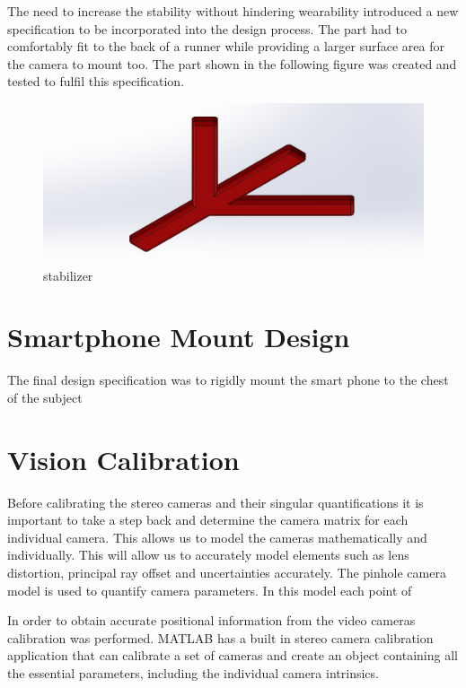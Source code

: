 The need to increase the stability without hindering wearability introduced a new specification to be incorporated into the design process. The part had to comfortably fit to the back of a runner while providing a larger surface area for the camera to mount too. The part shown in the following figure was created and tested to fulfil this specification.

\begin{figure}[!ht] 
\captionsetup{width=\linewidth, font=small}  
\includegraphics[width=\linewidth]{figures/stabil.JPG}
\caption{stabilizer}
\label{fig:stabil}
\end{figure}


\section{Smartphone Mount Design}
The final design specification was to rigidly mount the smart phone to the chest of the subject


\section{Vision Calibration}
Before calibrating the stereo cameras and their singular quantifications it is important to take a step back and determine the camera matrix for each individual camera. This allows us to model the cameras mathematically and individually. This will allow us to accurately model elements such as lens distortion, principal ray offset and uncertainties accurately. The pinhole camera model is used to quantify camera parameters. In this model each point of 

In order to obtain accurate positional information from the video cameras calibration was performed. MATLAB has a built in stereo camera calibration application that can calibrate a set of cameras and create an object containing all the essential parameters, including the individual camera intrinsics.

